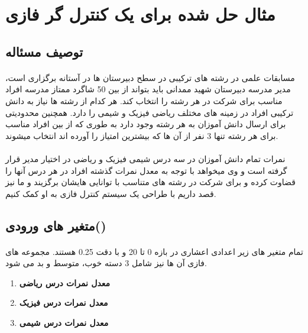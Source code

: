 \documentclass[12pt]{article}
\begin{document}
\section{مثال حل شده برای یک کنترل گر فازی}
\subsection{توصیف مسئاله}

\paragraph{}
مسابقات علمی در رشته های ترکیبی در سطح دبیرستان ها در آستانه برگزاری است، مدیر مدرسه دبیرستان شهید ممدانی باید بتواند از بین 50 شاگرد ممتاز مدرسه افراد مناسب برای شرکت در هر رشته را انتخاب کند. هر کدام از رشته ها نیاز به دانش ترکیبی افراد در زمینه های مختلف ریاضی فیزیک و شیمی را دارد. همچنین محدودیتی برای ارسال دانش آموزان به هر رشته وجود دارد به طوری که از بین افراد مناسب برای هر رشته تنها 3 نفر از آن ها که بیشترین امتیاز را آورده اند انتخاب میشوند.

\paragraph{}
نمرات تمام دانش آموزان در سه درس شیمی فیزیک و ریاضی در اختیار مدیر قرار گرفته است و وی میخواهد با توجه به معدل نمرات گذشته افراد در هر درس آنها را قضاوت کرده و برای شرکت در رشته های متناسب با توانایی هایشان برگزیند و ما نیز قصد داریم با طراحی یک سیستم کنترل فازی به او کمک کنیم.


\subsection{متغیر های ورودی()}
\paragraph{}
تمام متغیر های زیر اعدادی اعشاری در بازه 0 تا 20 و با دقت 0.25 هستند.
مجموعه های فازی آن ها نیز شامل 3 دسته خوب، متوسط و بد می شود.
\begin{enumerate}
    \item {
          \textbf{معدل نمرات درس ریاضی}
          }
    \item {
          \textbf{معدل نمرات درس فیزیک}
          }
    \item {
          \textbf{معدل نمرات درس شیمی}
          }

\end{enumerate}
\end{document}
